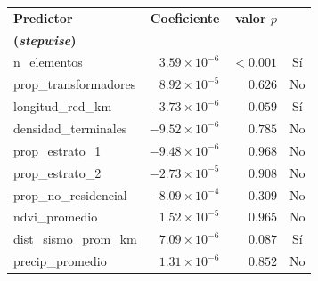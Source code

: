 \begin{tabular}{l r r c}
\toprule
\textbf{Predictor} & \textbf{Coeficiente} & \textbf{valor $p$} & \makecell[c]{\textbf{Retenido}\\\textbf{(\emph{stepwise})}} \\
\midrule
n\_elementos & $3{.}59\times10^{-6}$ & $<0{.}001$ & Sí \\
prop\_transformadores & $8{.}92\times10^{-5}$ & $0{.}626$ & No \\
longitud\_red\_km & $-3{.}73\times10^{-6}$ & $0{.}059$ & Sí \\
densidad\_terminales & $-9{.}52\times10^{-6}$ & $0{.}785$ & No \\
prop\_estrato\_1 & $-9{.}48\times10^{-6}$ & $0{.}968$ & No \\
prop\_estrato\_2 & $-2{.}73\times10^{-5}$ & $0{.}908$ & No \\
prop\_no\_residencial & $-8{.}09\times10^{-4}$ & $0{.}309$ & No \\
ndvi\_promedio & $1{.}52\times10^{-5}$ & $0{.}965$ & No \\
dist\_sismo\_prom\_km & $7{.}09\times10^{-6}$ & $0{.}087$ & Sí \\
precip\_promedio & $1{.}31\times10^{-6}$ & $0{.}852$ & No \\
\bottomrule
\end{tabular}
